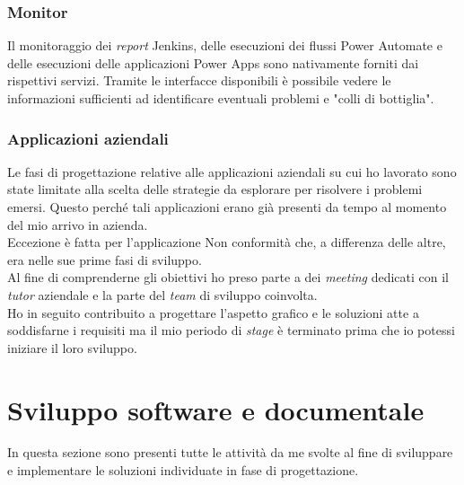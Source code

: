 \subsubsection*{Monitor}
Il monitoraggio dei \emph{report} Jenkins, delle esecuzioni dei flussi Power Automate e delle esecuzioni delle applicazioni Power Apps sono nativamente forniti dai rispettivi servizi. Tramite le interfacce disponibili è possibile vedere le informazioni sufficienti ad identificare eventuali problemi e "colli di bottiglia". 

\subsubsection*{Applicazioni aziendali} 
Le fasi di progettazione relative alle applicazioni aziendali su cui ho lavorato sono state limitate alla scelta delle strategie da esplorare per risolvere i problemi emersi. Questo perché tali applicazioni erano già presenti da tempo al momento del mio arrivo in azienda.\\
Eccezione è fatta per l'applicazione Non conformità che, a differenza delle altre, era nelle sue prime fasi di sviluppo.\\
Al fine di comprenderne gli obiettivi ho preso parte a dei \emph{meeting} dedicati con il \emph{tutor} aziendale e la parte del \emph{team} di sviluppo coinvolta.\\ 
Ho in seguito contribuito a progettare l'aspetto grafico e le soluzioni atte a soddisfarne i requisiti ma il mio periodo di \emph{stage} è terminato prima che io potessi iniziare il loro sviluppo.  

\section{Sviluppo software e documentale}
In questa sezione sono presenti tutte le attività da me svolte al fine di sviluppare e implementare le soluzioni individuate in fase di progettazione.
